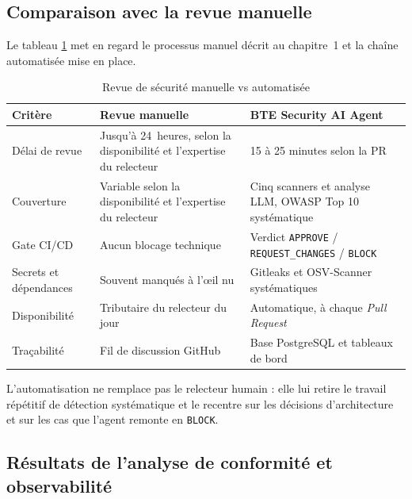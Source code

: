     \subsection{Comparaison avec la revue manuelle}

        Le tableau \ref{tab:baseline} met en regard le processus manuel décrit au
        chapitre~1 et la chaîne automatisée mise en place.

        \begin{table}[H]
        \centering
        \begin{tabular}{|m{3.2cm}|m{4.7cm}|m{4.7cm}|}
        \hline
        \textbf{Critère} & \textbf{Revue manuelle} & \textbf{BTE Security AI Agent} \\
        \hline
        Délai de revue & Jusqu'à 24~heures, selon la disponibilité et l'expertise du relecteur & 15 à 25 minutes selon la PR \\
        \hline
        Couverture & Variable selon la disponibilité et l'expertise du relecteur & Cinq scanners et analyse LLM, OWASP Top 10 systématique \\
        \hline
        Gate CI/CD & Aucun blocage technique & Verdict \texttt{APPROVE} / \texttt{REQUEST\_\allowbreak{}CHANGES} / \texttt{BLOCK} \\
        \hline
        Secrets et dépendances & Souvent manqués à l'œil nu & Gitleaks et OSV-Scanner systématiques \\
        \hline
        Disponibilité & Tributaire du relecteur du jour & Automatique, à chaque \textit{Pull Request} \\
        \hline
        Traçabilité & Fil de discussion GitHub & Base PostgreSQL et tableaux de bord \\
        \hline
        \end{tabular}
        \caption{Revue de sécurité manuelle vs automatisée}
        \label{tab:baseline}
        \end{table}

        L'automatisation ne remplace pas le relecteur humain : elle lui retire le travail
        répétitif de détection systématique et le recentre sur les décisions
        d'architecture et sur les cas que l'agent remonte en \texttt{BLOCK}.

    \subsection{Résultats de l'analyse de conformité et observabilité}

